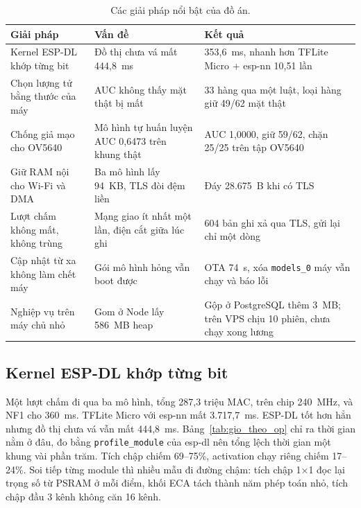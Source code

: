\documentclass[../DoAn.tex]{subfiles}
\begin{document}
\begin{table}[!htb]
\centering
\small
\caption{Các giải pháp nổi bật của đồ án.}
\label{tab:dong_gop}
\begin{tabular}{|L{4.3cm}|L{4.6cm}|L{4.6cm}|}
\hline
\textbf{Giải pháp} & \textbf{Vấn đề} & \textbf{Kết quả} \\
\hline
Kernel ESP-DL khớp từng bit & Đồ thị chưa vá mất 444,8~ms & 353,6~ms, nhanh hơn TFLite Micro + esp-nn 10,51 lần \\
\hline
Chọn lượng tử bằng thước của máy & AUC không thấy mặt thật bị mất & 33 hàng qua một luật, loại hàng giữ 49/62 mặt thật \\
\hline
Chống giả mạo cho OV5640 & Mô hình tự huấn luyện AUC 0,6473 trên khung thật & AUC 1,0000, giữ 59/62, chặn 25/25 trên tập OV5640 \\
\hline
Giữ RAM nội cho Wi-Fi và DMA & Ba mô hình lấy 94~KB, TLS đòi đệm liền & Đáy 28.675~B khi có TLS \\
\hline
Lượt chấm không mất, không trùng & Mạng giao ít nhất một lần, điện cắt giữa lúc ghi & 604 bản ghi xả qua TLS, gửi lại chỉ một dòng \\
\hline
Cập nhật từ xa không làm chết máy & Gói mô hình hỏng vẫn boot được & OTA 74~s, xóa \texttt{models\_0} máy vẫn chạy và báo lỗi \\
\hline
Nghiệp vụ trên máy chủ nhỏ & Gom ở Node lấy 586~MB heap & Gộp ở PostgreSQL thêm 3~MB; trên VPS chịu 10 phiên, chưa chạy xong lương \\
\hline
\end{tabular}
\end{table}

\subsection{Kernel ESP-DL khớp từng bit}
\label{section:5.8.1}

Một lượt chấm đi qua ba mô hình, tổng 287,3 triệu MAC, trên chip 240~MHz, và NF1 cho 360~ms. TFLite Micro với esp-nn mất 3.717,7~ms. ESP-DL tốt hơn hẳn nhưng
đồ thị chưa vá vẫn mất 444,8~ms. Bảng~\ref{tab:gio_theo_op} chỉ ra thời gian nằm ở đâu, đo bằng \texttt{profile\_module} của esp-dl nên tổng lệch thời gian
một khung vài phần trăm. Tích chập chiếm 69--75\%, activation chạy riêng chiếm 17--24\%. Soi tiếp từng module thì nhiều mẫu đi đường chậm: tích chập
1$\times$1 đọc lại trọng số từ PSRAM ở mỗi điểm, khối ECA tách thành năm phép toán nhỏ, tích chập đầu 3 kênh không căn 16 kênh.
\end{document}
